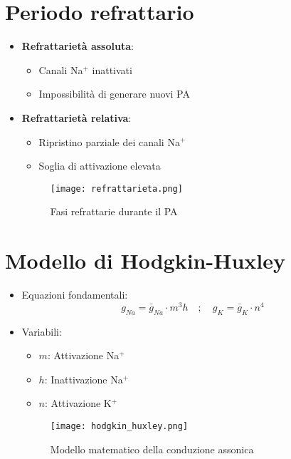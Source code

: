 \documentclass{article}
\begin{document}
\section{Periodo refrattario}
\begin{itemize}
\item \textbf{Refrattarietà assoluta}:
  \begin{itemize}
  \item Canali Na\(^+\) inattivati
  \item Impossibilità di generare nuovi PA
  \end{itemize}

\item \textbf{Refrattarietà relativa}:
  \begin{itemize}
  \item Ripristino parziale dei canali Na\(^+\)
  \item Soglia di attivazione elevata
  \end{itemize}

\begin{figure}[h]
\centering
\texttt{[image: refrattarieta.png]}
\caption{Fasi refrattarie durante il PA}
\label{fig:refrattario}
\end{figure}
\end{itemize}

\section{Modello di Hodgkin-Huxley}
\begin{itemize}
\item Equazioni fondamentali:
\[
g_{Na} = \bar{g}_{Na} \cdot m^3 h \quad;\quad g_K = \bar{g}_K \cdot n^4
\]
\item Variabili:
  \begin{itemize}
  \item \( m \): Attivazione Na\(^+\)
  \item \( h \): Inattivazione Na\(^+\)
  \item \( n \): Attivazione K\(^+\)
  \end{itemize}

\begin{figure}[h]
\centering
\texttt{[image: hodgkin\_huxley.png]}
\caption{Modello matematico della conduzione assonica}
\label{fig:hodgkin}
\end{figure}
\end{itemize}
\end{document}
